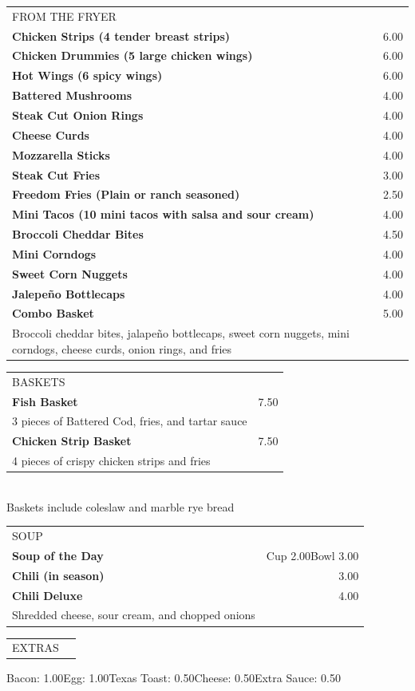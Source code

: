 \documentclass[10pt,notitlepage]{article}
\makeatletter
\newcommand*\ColText[1]{\uppercase{#1}}
\newenvironment{Group}[1]
	{\noindent\begin{tabular*}{\textwidth}{@{}p{.8\linewidth}@{\extracolsep{\fill}}r@{}}
		{\fontsize{16}{20}\selectfont\ColText{#1}}\\[0.8em]}
	{\end{tabular*}}
\newcommand*\Item[2]{%
	\sffamily\textbf{#1}\dotfill & #2}
\newcommand*\Desc[1]{%
	\sffamily\hspace*{1em}\footnotesize #1}
\makeatother
\begin{document}
	\vfill{}
	
	\begin{Group}{From the Fryer}
		\Item{Chicken Strips (4 tender breast strips)}{6.00} \\
		\Item{Chicken Drummies (5 large chicken wings)}{6.00} \\
		\Item{Hot Wings (6 spicy wings)}{6.00} \\
		\Item{Battered Mushrooms}{4.00} \\
		\Item{Steak Cut Onion Rings}{4.00} \\
		\Item{Cheese Curds}{4.00} \\
		\Item{Mozzarella Sticks}{4.00} \\
		\Item{Steak Cut Fries}{3.00} \\
		\Item{Freedom Fries (Plain or ranch seasoned)}{2.50} \\
		\Item{Mini Tacos (10 mini tacos with salsa and sour cream)}{4.00} \\
		\Item{Broccoli Cheddar Bites}{4.50} \\
		\Item{Mini Corndogs}{4.00} \\
		\Item{Sweet Corn Nuggets}{4.00} \\
		\Item{Jalepe\~{n}o Bottlecaps}{4.00} \\
		\Item{Combo Basket}{5.00} \\
		\Desc{Broccoli cheddar bites, jalape\~{n}o bottlecaps, sweet corn nuggets, mini corndogs, cheese curds, onion rings, and fries} \\
	\end{Group}
	
	\vfill{}
	
	\begin{Group}{Baskets}
		\Item{Fish Basket}{7.50} \\
		\Desc{3 pieces of Battered Cod, fries, and tartar sauce} \\
		\Item{Chicken Strip Basket}{7.50} \\
		\Desc{4 pieces of crispy chicken strips and fries} \\
	\end{Group}
	\\[\baselineskip]
	\centering Baskets include coleslaw and marble rye bread \\
	
	\vfill{}
	
	\begin{Group}{Soup}
		\Item{Soup of the Day}{Cup 2.00\hspace{0.2in}Bowl 3.00} \\
		\Item{Chili (in season)}{3.00} \\
		\Item{Chili Deluxe}{4.00} \\
		\Desc{Shredded cheese, sour cream, and chopped onions} \\
	\end{Group}
	
	\vfill{}
	
	\begin{Group}{Extras}
	\end{Group}
	\centering Bacon: 1.00\hspace{0.2in}Egg: 1.00\hspace{0.2in}Texas Toast: 0.50\hspace{0.2in}Cheese: 0.50\hspace{0.2in}Extra Sauce: 0.50\par
	
\end{document}
